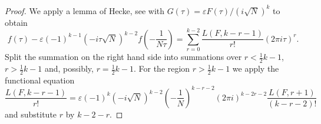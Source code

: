 \begin{proof}
    We apply a lemma of Hecke, see \cite[Section 5]{weil1977remarks} with $G(\tau) = \varepsilon F(\tau) / (i \sqrt{N})^k$ to obtain
    $$
        f(\tau) - \varepsilon(-1)^{k-1} (-i \tau \sqrt{N})^{k-2} f\left(-\frac{1}{N\tau}\right) = \sum_{r = 0}^{k-2} \frac{L(F, k - r - 1)}{r!} (2 \pi i \tau)^r.
    $$
    Split the summation on the right hand side into summations over $r < \frac{1}{2}k - 1$, $r > \frac{1}{2}k - 1$ and,
    possibly, $r = \frac{1}{2}k - 1$.
    For the region $r > \frac{1}{2}k - 1$ we apply the functional equation
    $$
        \frac{L(F, k - r - 1)}{r!} = \varepsilon (-1)^{k} (-i\sqrt{N})^{k-2} \left(-\frac{1}{N}\right)^{k-r-2} (2 \pi i )^{k- 2r - 2} \frac{L(F, r + 1)}{(k - r - 2)!}
    $$
    and substitute $r$ by $k - 2 - r$.
\end{proof}
